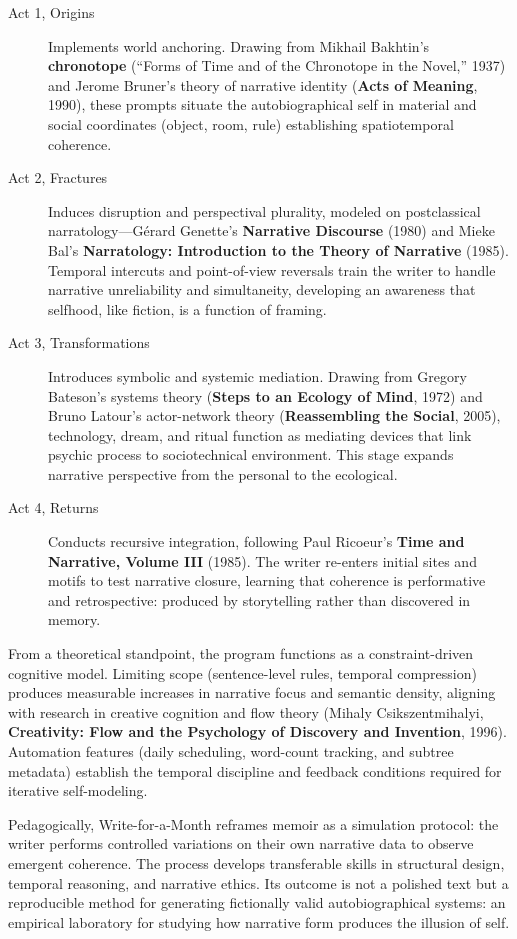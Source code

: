 \documentclass[11pt]{article}
\begin{document}
\begin{description}
\item[{Act 1, Origins}] Implements world anchoring. Drawing from Mikhail Bakhtin’s \textbf{chronotope} (“Forms of Time and of the Chronotope in the Novel,” 1937) and Jerome Bruner’s theory of narrative identity (\textbf{Acts of Meaning}, 1990), these prompts situate the autobiographical self in material and social coordinates (object, room, rule) establishing spatiotemporal coherence.
\item[{Act 2, Fractures}] Induces disruption and perspectival plurality, modeled on postclassical narratology—Gérard Genette’s \textbf{Narrative Discourse} (1980) and Mieke Bal’s \textbf{Narratology: Introduction to the Theory of Narrative} (1985). Temporal intercuts and point-of-view reversals train the writer to handle narrative unreliability and simultaneity, developing an awareness that selfhood, like fiction, is a function of framing.
\item[{Act 3, Transformations}] Introduces symbolic and systemic mediation. Drawing from Gregory Bateson’s systems theory (\textbf{Steps to an Ecology of Mind}, 1972) and Bruno Latour’s actor-network theory (\textbf{Reassembling the Social}, 2005), technology, dream, and ritual function as mediating devices that link psychic process to sociotechnical environment. This stage expands narrative perspective from the personal to the ecological.
\item[{Act 4, Returns}] Conducts recursive integration, following Paul Ricoeur’s \textbf{Time and Narrative, Volume III} (1985). The writer re-enters initial sites and motifs to test narrative closure, learning that coherence is performative and retrospective: produced by storytelling rather than discovered in memory.
\end{description}

From a theoretical standpoint, the program functions as a constraint-driven cognitive model. Limiting scope (sentence-level rules, temporal compression) produces measurable increases in narrative focus and semantic density, aligning with research in creative cognition and flow theory (Mihaly Csikszentmihalyi, \textbf{Creativity: Flow and the Psychology of Discovery and Invention}, 1996). Automation features (daily scheduling, word-count tracking, and subtree metadata) establish the temporal discipline and feedback conditions required for iterative self-modeling.

Pedagogically, Write-for-a-Month reframes memoir as a simulation protocol: the writer performs controlled variations on their own narrative data to observe emergent coherence. The process develops transferable skills in structural design, temporal reasoning, and narrative ethics. Its outcome is not a polished text but a reproducible method for generating fictionally valid autobiographical systems: an empirical laboratory for studying how narrative form produces the illusion of self.
\end{document}
